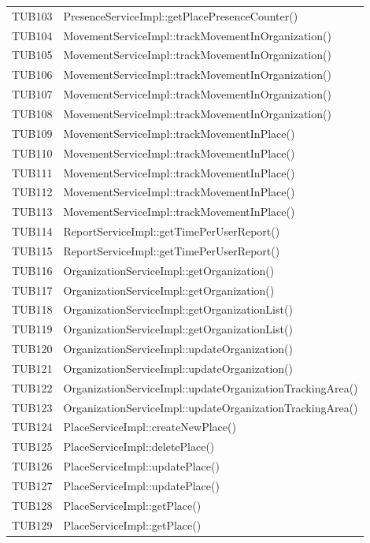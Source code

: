 {\begin{longtable}{C{2cm} C{8cm}}
TUB103 & PresenceServiceImpl::getPlacePresenceCounter()\\
TUB104 & MovementServiceImpl::trackMovementInOrganization()\\
TUB105 & MovementServiceImpl::trackMovementInOrganization()\\
TUB106 & MovementServiceImpl::trackMovementInOrganization()\\
TUB107 & MovementServiceImpl::trackMovementInOrganization()\\
TUB108 & MovementServiceImpl::trackMovementInOrganization()\\
TUB109 & MovementServiceImpl::trackMovementInPlace()\\
TUB110 & MovementServiceImpl::trackMovementInPlace()\\
TUB111 & MovementServiceImpl::trackMovementInPlace()\\
TUB112 & MovementServiceImpl::trackMovementInPlace()\\
TUB113 & MovementServiceImpl::trackMovementInPlace()\\
TUB114 & ReportServiceImpl::getTimePerUserReport()\\
TUB115 & ReportServiceImpl::getTimePerUserReport()\\
TUB116 & OrganizationServiceImpl::getOrganization()\\
TUB117 & OrganizationServiceImpl::getOrganization()\\
TUB118 & OrganizationServiceImpl::getOrganizationList()\\
TUB119 & OrganizationServiceImpl::getOrganizationList()\\
TUB120 & OrganizationServiceImpl::updateOrganization()\\
TUB121 & OrganizationServiceImpl::updateOrganization()\\
TUB122 & OrganizationServiceImpl::updateOrganizationTrackingArea()\\
TUB123 & OrganizationServiceImpl::updateOrganizationTrackingArea()\\
TUB124 & PlaceServiceImpl::createNewPlace()\\
TUB125 & PlaceServiceImpl::deletePlace()\\
TUB126 & PlaceServiceImpl::updatePlace()\\
TUB127 & PlaceServiceImpl::updatePlace()\\
TUB128 & PlaceServiceImpl::getPlace()\\
TUB129 & PlaceServiceImpl::getPlace()\\

\end{longtable}
}